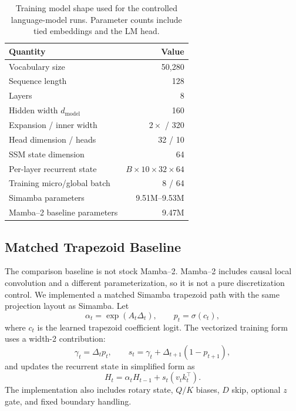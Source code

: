 \documentclass[conference]{IEEEtran}
\newcommand{\modelname}{Simamba\xspace}
\newcommand{\mambatwo}{Mamba--2\xspace}
\begin{document}
\begin{table}[t]
\caption{Training model shape used for the controlled language-model runs. Parameter counts include tied embeddings and the LM head.}
\label{tab:model_shape}
\centering
\footnotesize
\begin{tabular}{@{}lr@{}}
\toprule
Quantity & Value\\
\midrule
Vocabulary size & 50,280\\
Sequence length & 128\\
Layers & 8\\
Hidden width $d_{\mathrm{model}}$ & 160\\
Expansion / inner width & $2\times$ / 320\\
Head dimension / heads & 32 / 10\\
SSM state dimension & 64\\
Per-layer recurrent state & $B\times10\times32\times64$\\
Training micro/global batch & 8 / 64\\
\modelname{} parameters & 9.51M--9.53M\\
\mambatwo{} baseline parameters & 9.47M\\
\bottomrule
\end{tabular}
\end{table}

\subsection{Matched Trapezoid Baseline}

The comparison baseline is not stock \mambatwo. \mambatwo includes causal local convolution and a different parameterization, so it is not a pure discretization control. We implemented a matched \modelname trapezoid path with the same projection layout as \modelname. Let
\begin{equation}
    \alpha_t=\exp(A_t\Delta_t), \qquad p_t = \sigma(c_t),
\end{equation}
where $c_t$ is the learned trapezoid coefficient logit. The vectorized training form uses a width-2 contribution:
\begin{equation}
    \gamma_t = \Delta_t p_t,\qquad
    s_t = \gamma_t + \Delta_{t+1}(1-p_{t+1}),
\end{equation}
and updates the recurrent state in simplified form as
\begin{equation}
    H_t = \alpha_t H_{t-1} + s_t(v_tk_t^\top).
\end{equation}
The implementation also includes rotary state, $Q/K$ biases, $D$ skip, optional $z$ gate, and fixed boundary handling.
\end{document}
